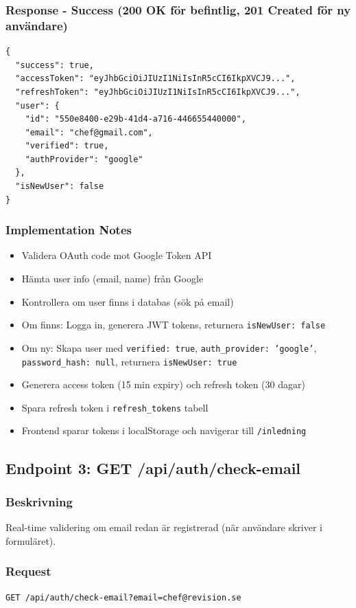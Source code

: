 \documentclass[12pt,a4paper]{article}
\begin{document}
\subsubsection{Response - Success (200 OK för befintlig, 201 Created för ny användare)}
\begin{lstlisting}
{
  "success": true,
  "accessToken": "eyJhbGciOiJIUzI1NiIsInR5cCI6IkpXVCJ9...",
  "refreshToken": "eyJhbGciOiJIUzI1NiIsInR5cCI6IkpXVCJ9...",
  "user": {
    "id": "550e8400-e29b-41d4-a716-446655440000",
    "email": "chef@gmail.com",
    "verified": true,
    "authProvider": "google"
  },
  "isNewUser": false
}
\end{lstlisting}

\subsubsection{Implementation Notes}
\begin{itemize}[noitemsep]
  \item Validera OAuth code mot Google Token API
  \item Hämta user info (email, name) från Google
  \item Kontrollera om user finns i databas (sök på email)
  \item Om finns: Logga in, generera JWT tokens, returnera \texttt{isNewUser: false}
  \item Om ny: Skapa user med \texttt{verified: true}, \texttt{auth\_provider: 'google'}, \texttt{password\_hash: null}, returnera \texttt{isNewUser: true}
  \item Generera access token (15 min expiry) och refresh token (30 dagar)
  \item Spara refresh token i \texttt{refresh\_tokens} tabell
  \item Frontend sparar tokens i localStorage och navigerar till \texttt{/inledning}
\end{itemize}

\subsection{Endpoint 3: GET /api/auth/check-email}

\subsubsection{Beskrivning}
Real-time validering om email redan är registrerad (när användare skriver i formuläret).

\subsubsection{Request}
\begin{verbatim}
GET /api/auth/check-email?email=chef@revision.se
\end{verbatim}
\end{document}
